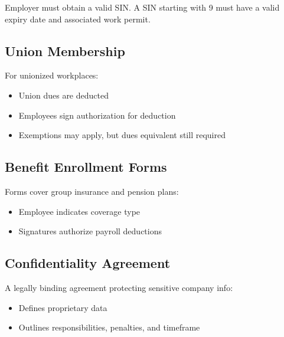\documentclass[letterpaper,10pt,english]{sphinxmanual}
\begin{document}
\sphinxAtStartPar
{} Employer must obtain a valid SIN. A SIN starting with 9 must have a valid expiry date and associated work permit.


\subsection{Union Membership}
\label{\detokenize{onboarding_employee:union-membership}}
\sphinxAtStartPar
For unionized workplaces:
\begin{itemize}
\item {} 
\sphinxAtStartPar
Union dues are deducted

\item {} 
\sphinxAtStartPar
Employees sign authorization for deduction

\item {} 
\sphinxAtStartPar
Exemptions may apply, but dues equivalent still required

\end{itemize}


\subsection{Benefit Enrollment Forms}
\label{\detokenize{onboarding_employee:benefit-enrollment-forms}}
\sphinxAtStartPar
Forms cover group insurance and pension plans:
\begin{itemize}
\item {} 
\sphinxAtStartPar
Employee indicates coverage type

\item {} 
\sphinxAtStartPar
Signatures authorize payroll deductions

\end{itemize}


\subsection{Confidentiality Agreement}
\label{\detokenize{onboarding_employee:confidentiality-agreement}}
\sphinxAtStartPar
A legally binding agreement protecting sensitive company info:
\begin{itemize}
\item {} 
\sphinxAtStartPar
Defines proprietary data

\item {} 
\sphinxAtStartPar
Outlines responsibilities, penalties, and timeframe

\end{itemize}
\end{document}
